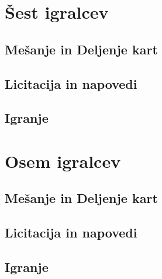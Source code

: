 \documentclass[a4paper, ]{report}
\begin{document}
\part{Šest igralcev}

\chapter{Mešanje in Deljenje kart}
\chapter{Licitacija in napovedi}
\chapter{Igranje}

\part{Osem igralcev}

\chapter{Mešanje in Deljenje kart}
\chapter{Licitacija in napovedi}
\chapter{Igranje}
\end{document}
